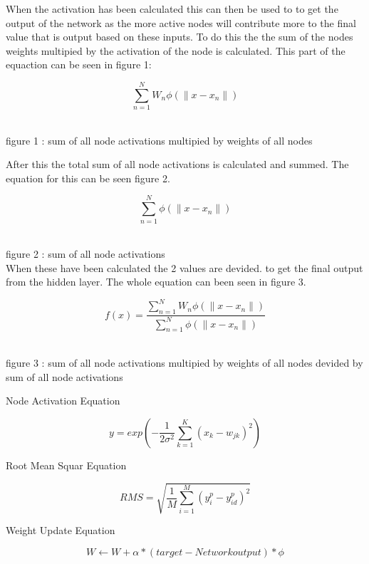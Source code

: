 \documentclass{IEEEtran}
\begin{document}
\begin{flushleft}
  When the activation has been calculated this can then be used to to get the output of the network
  as the more active nodes will contribute more to the final value that is output based on these inputs.
  To do this the the sum of the nodes weights multipied by the activation of the node is calculated.
  This part of the equaction can be seen in figure 1:
  \vspace{3mm}

  $$\sum_{n=1}^{N}W _n\phi(\|x-x_n\|) $$
  \\
  \vspace{1.5mm}

  {\footnotesize figure 1 : sum of all node activations multipied by weights of all nodes}

  \vspace{3mm}
  After this the total sum of all node activations is calculated and summed. The equation for this
  can be seen figure 2.

  \vspace{3mm}

  $$\sum_{n=1}^{N}\phi(\|x-x_n\|) $$
  \\
  \vspace{1.5mm}

  {\footnotesize figure 2 : sum of all node activations}
  \\
  \vspace{3mm}
  When these have been calculated the 2 values are devided. to get the final output from the
  hidden layer. The whole equation can been seen in figure 3.

  \vspace{3mm}

  $$f(x)=\frac{\sum_{n=1}^{N}W _n\phi(\|x-x_n\|)}{\sum_{n=1}^{N}\phi(\|x-x_n\|)}$$
  \\
  \vspace{1.5mm}

  {\footnotesize figure 3 : sum of all node activations multipied by weights of all nodes
  devided by sum of all node activations}
  \\
  \vspace{3mm}

\end{flushleft}

\begin{center}
  Node Activation Equation
\end{center}
$$y=exp(-\frac{1}{2\sigma^2} \sum_{k=1}^{K}(x_{k} - w_{jk})^2) $$
\begin{center}
  Root Mean Squar Equation
\end{center}
$$RMS =\sqrt{\frac{1}{M}\sum_{i=1}^{M}(y^{p}_{i} - y^{p}_{id})^2} $$
\begin{center}
Weight Update Equation
\end{center}
$$ W  \leftarrow W + \alpha *(target - Network output)*\phi$$
\end{document}
